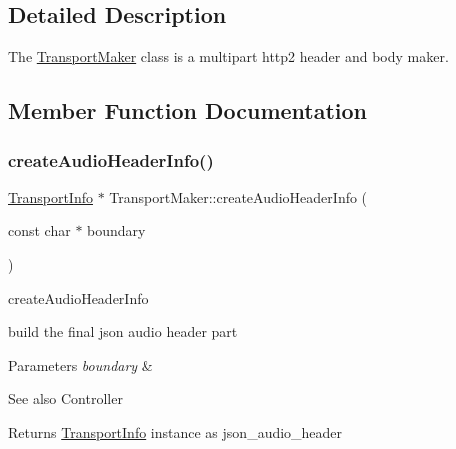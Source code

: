 \subsection{Detailed Description}
The \hyperlink{classAlexaEvent_1_1TransportMaker}{Transport\+Maker} class is a multipart http2 header and body maker. 

\subsection{Member Function Documentation}
\mbox{\label{classAlexaEvent_1_1TransportMaker_acbbf4e90a8350fa760cf8cc072ed2501}} 
\subsubsection{\texorpdfstring{create\+Audio\+Header\+Info()}{createAudioHeaderInfo()}}
{\footnotesize\ttfamily \hyperlink{classAlexaEvent_1_1TransportInfo}{Transport\+Info} $\ast$ Transport\+Maker\+::create\+Audio\+Header\+Info (\begin{DoxyParamCaption}\item[{const char $\ast$}]{boundary }\end{DoxyParamCaption})}



create\+Audio\+Header\+Info 

build the final json audio header part 
\begin{DoxyParams}{Parameters}
{\em boundary} & \\
\hline
\end{DoxyParams}
\begin{DoxySeeAlso}{See also}
Controller 
\end{DoxySeeAlso}
\begin{DoxyReturn}{Returns}
\hyperlink{classAlexaEvent_1_1TransportInfo}{Transport\+Info} instance as json\+\_\+audio\+\_\+header 
\end{DoxyReturn}
\mbox{\label{classAlexaEvent_1_1TransportMaker_ae7337a2522cea0ced276ff43be504800}} 
